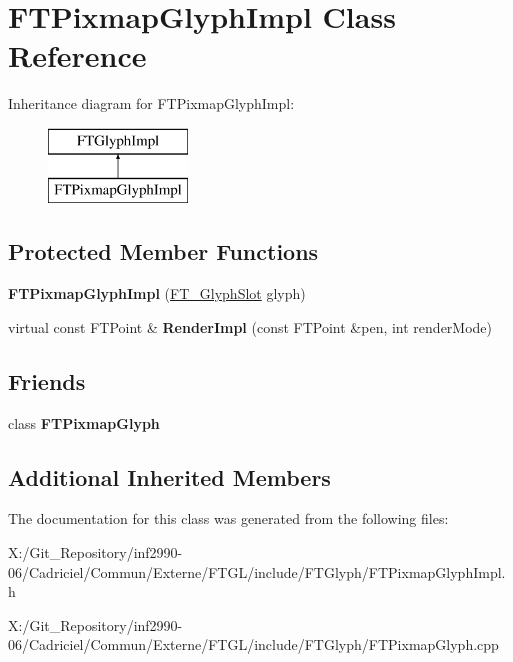 \hypertarget{class_f_t_pixmap_glyph_impl}{\section{F\-T\-Pixmap\-Glyph\-Impl Class Reference}
\label{class_f_t_pixmap_glyph_impl}
}
Inheritance diagram for F\-T\-Pixmap\-Glyph\-Impl\-:\begin{figure}[H]
\begin{center}
\leavevmode
\includegraphics[height=2.000000cm]{class_f_t_pixmap_glyph_impl}
\end{center}
\end{figure}
\subsection*{Protected Member Functions}
\begin{DoxyCompactItemize}
\item 
\hypertarget{class_f_t_pixmap_glyph_impl_a65e1773b7c1f422abbccd90399cd3ec4}{{\bfseries F\-T\-Pixmap\-Glyph\-Impl} (\hyperlink{struct_f_t___glyph_slot_rec__}{F\-T\-\_\-\-Glyph\-Slot} glyph)}\label{class_f_t_pixmap_glyph_impl_a65e1773b7c1f422abbccd90399cd3ec4}

\item 
\hypertarget{class_f_t_pixmap_glyph_impl_a9c5cf9105b59301f0b27cfa2350012c6}{virtual const F\-T\-Point \& {\bfseries Render\-Impl} (const F\-T\-Point \&pen, int render\-Mode)}\label{class_f_t_pixmap_glyph_impl_a9c5cf9105b59301f0b27cfa2350012c6}

\end{DoxyCompactItemize}
\subsection*{Friends}
\begin{DoxyCompactItemize}
\item 
\hypertarget{class_f_t_pixmap_glyph_impl_ab141fccf761e39b9e4bec64cda0507a7}{class {\bfseries F\-T\-Pixmap\-Glyph}}\label{class_f_t_pixmap_glyph_impl_ab141fccf761e39b9e4bec64cda0507a7}

\end{DoxyCompactItemize}
\subsection*{Additional Inherited Members}


The documentation for this class was generated from the following files\-:\begin{DoxyCompactItemize}
\item 
X\-:/\-Git\-\_\-\-Repository/inf2990-\/06/\-Cadriciel/\-Commun/\-Externe/\-F\-T\-G\-L/include/\-F\-T\-Glyph/F\-T\-Pixmap\-Glyph\-Impl.\-h\item 
X\-:/\-Git\-\_\-\-Repository/inf2990-\/06/\-Cadriciel/\-Commun/\-Externe/\-F\-T\-G\-L/include/\-F\-T\-Glyph/F\-T\-Pixmap\-Glyph.\-cpp\end{DoxyCompactItemize}
